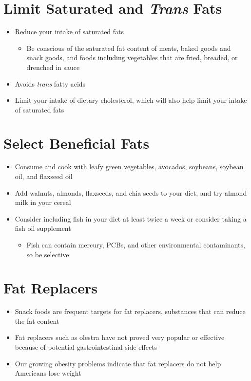 \documentclass[title={Chapter 5}]{fdsn201notes}
\begin{document}
\section{Limit Saturated and \textit{Trans} Fats}\label{sec:limit-saturated-and-trans-fats}
\begin{itemize}
	\item Reduce your intake of saturated fats
	\begin{itemize}
		\item Be conscious of the saturated fat content of meats, baked goods and snack goods, and foods including vegetables that are fried, breaded, or drenched in sauce
	\end{itemize}
	\item Avoids \textit{trans} fatty acids
	\item Limit your intake of dietary cholesterol, which will also help limit your intake of saturated fats
\end{itemize}

\section{Select Beneficial Fats}\label{sec:select-beneficial-fats}
\begin{itemize}
	\item Consume and cook with leafy green vegetables, avocados, soybeans, soybean oil, and flaxseed oil
	\item Add walnuts, almonds, flaxseeds, and chia seeds to your diet, and try almond milk in your cereal
	\item Consider including fish in your diet at least twice a week or consider taking a fish oil supplement
	\begin{itemize}
		\item Fish can contain mercury, PCBs, and other environmental contaminants, so be selective
	\end{itemize}
\end{itemize}

\section{Fat Replacers}\label{sec:fat-replacers}
\begin{itemize}
	\item Snack foods are frequent targets for fat replacers, substances that can reduce the fat content
	\item Fat replacers such as olestra have not proved very popular or effective because of potential gastrointestinal side effects
	\item Our growing obesity problems indicate that fat replacers do not help Americans lose weight
\end{itemize}
\end{document}
